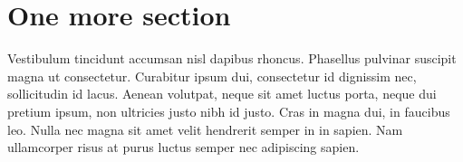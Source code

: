 \documentclass[a4paper,10pt,parskip,twocolumn]{article}
\begin{document}
\section{One more section}
Vestibulum tincidunt accumsan nisl dapibus rhoncus. Phasellus pulvinar suscipit magna ut consectetur. Curabitur ipsum dui, consectetur id dignissim nec, sollicitudin id lacus. Aenean volutpat, neque sit amet luctus porta, neque dui pretium ipsum, non ultricies justo nibh id justo. Cras in magna dui, in faucibus leo. Nulla nec magna sit amet velit hendrerit semper in in sapien. Nam ullamcorper risus at purus luctus semper nec adipiscing sapien.

%

%
\printbibliography
\end{document}
